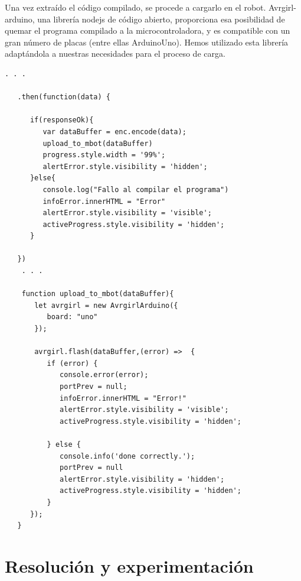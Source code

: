 \documentclass{report}
\begin{document}
Una vez extraído el código compilado, se procede a cargarlo en el robot. Avrgirl-arduino, una librería nodejs de código abierto, proporciona esa posibilidad de quemar el programa compilado a la microcontroladora, y es compatible con un gran número de placas (entre ellas ArduinoUno). Hemos utilizado esta librería adaptándola a nuestras necesidades para el proceso de carga.
\\
\begin{lstlisting}[frame=single,breaklines=true, label=Carga del compilado al Mbot, caption=Carga del compilado al Mbot, captionpos=b]
   . . . 
   
   .then(function(data) {

      if(responseOk){
         var dataBuffer = enc.encode(data);
         upload_to_mbot(dataBuffer)
         progress.style.width = '99%';
         alertError.style.visibility = 'hidden';
      }else{
         console.log("Fallo al compilar el programa")
         infoError.innerHTML = "Error"
         alertError.style.visibility = 'visible';
         activeProgress.style.visibility = 'hidden';
      }

   })
    . . . 
    
    function upload_to_mbot(dataBuffer){
       let avrgirl = new AvrgirlArduino({
          board: "uno"
       });

       avrgirl.flash(dataBuffer,(error) =>  {
          if (error) {
             console.error(error);
             portPrev = null;
             infoError.innerHTML = "Error!"
             alertError.style.visibility = 'visible';
             activeProgress.style.visibility = 'hidden';

          } else {
             console.info('done correctly.');
             portPrev = null
             alertError.style.visibility = 'hidden';
             activeProgress.style.visibility = 'hidden';
          }
      });
   }

\end{lstlisting}

\section{Resolución y experimentación}
\end{document}
